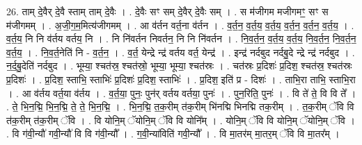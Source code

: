 \documentclass[17pt]{extarticle}
\begin{document}
26. ताम् दे॒वैर् दे॒वै स्ताम् ताम् दे॒वैः । . दे॒वैः सꣳ सम् दे॒वैर् दे॒वैः सम् । . स म॑जीगम मजीगमꣳ॒॒ सꣳ स म॑जीगमम् । . अ॒जी॒ग॒म॒मित्य॑जीगमम् । . आ व॑र्तन वर्त॒ना व॑र्तन । . व॒र्त॒न॒ व॒र्त॒य॒ व॒र्त॒य॒ व॒र्त॒न॒ व॒र्त॒न॒ व॒र्त॒य॒ । . व॒र्त॒य॒ नि नि व॑र्तय वर्तय॒ नि । . नि नि॑वर्तन निवर्तन॒ नि नि नि॑वर्तन । . नि॒व॒र्त॒न॒ व॒र्त॒य॒ व॒र्त॒य॒ नि॒व॒र्त॒न॒ नि॒व॒र्त॒न॒ व॒र्त॒य॒ । . नि॒व॒र्त॒नेति॑ नि - व॒र्त॒न॒ । . व॒र्त॒ येन्द्रे न्द्र॑ वर्तय वर्त॒ येन्द्र॑ । . इन्द्र॑ नर्दबुद नर्दबु॒दे न्द्रे न्द्र॑ नर्दबुद । . न॒र्द॒बु॒देति॑ नर्दबुद । . भूम्या॒ श्चत॑स्र॒ श्चत॑स्रो॒ भूम्या॒ भूम्या॒ श्चत॑स्रः । . चत॑स्रः प्र॒दिशः॑ प्र॒दिश॒ श्चत॑स्र॒ श्चत॑स्रः प्र॒दिशः॑ । . प्र॒दिश॒ स्ताभि॒ स्ताभिः॑ प्र॒दिशः॑ प्र॒दिश॒ स्ताभिः॑ । . प्र॒दिश॒ इति॑ प्र - दिशः॑ । . ताभि॒रा ताभि॒ स्ताभि॒रा । . आ व॑र्तय वर्त॒या व॑र्तय । . व॒र्त॒या॒ पुनः॒ पुन॑र् वर्तय वर्तया॒ पुनः॑ । . पुन॒रिति॒ पुनः॑ । . वि ते॑ ते॒ वि वि ते᳚ । . ते॒ भि॒न॒द्मि॒ भि॒न॒द्मि॒ ते॒ ते॒ भि॒न॒द्मि॒ । . भि॒न॒द्मि॒ त॒क॒रीम् त॑क॒रीम् भि॑नद्मि भिनद्मि तक॒रीम् । . त॒क॒रीम् ॅवि वि त॑क॒रीम् त॑क॒रीम् ॅवि । . वि योनि॒म् ॅयोनि॒म् ॅवि वि योनि᳚म् । . योनि॒म् ॅवि वि योनि॒म् ॅयोनि॒म् ॅवि । . वि ग॑वी॒न्यौ॑ गवी॒न्यौ॑ वि वि ग॑वी॒न्यौ᳚ । . ग॒वी॒न्या॑विति॑ गवी॒न्यौ᳚ । . वि मा॒तर॑म् मा॒तर॒म् ॅवि वि मा॒तर᳚म् । \newline
\end{document}
